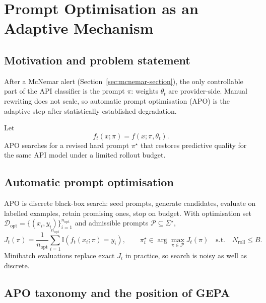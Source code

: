 \chapter{Prompt Optimisation as an Adaptive Mechanism}
\label{chap:prompt-optimisation}

\section{Motivation and problem statement}
\label{sec:motivation-prompt-adaptation}

After a McNemar alert (Section~\ref{sec:mcnemar-section}), the only controllable part of the API classifier is the prompt \(\pi\): weights \(\theta_t\) are provider-side. Manual rewriting does not scale, so automatic prompt optimisation (APO) is the adaptive step after statistically established degradation.

Let
\begin{equation}
    f_t(x;\pi)=f(x;\pi,\theta_t).
\end{equation}
APO searches for a revised hard prompt \(\pi^\star\) that restores predictive quality for the same API model under a limited rollout budget.

\section{Automatic prompt optimisation}
\label{sec:general-formulation-apo}

APO is discrete black-box search: seed prompts, generate candidates, evaluate on labelled examples, retain promising ones, stop on budget. With optimisation set \(\mathcal{D}_{\mathrm{opt}}=\{(x_i,y_i)\}_{i=1}^{n_{\mathrm{opt}}}\) and admissible prompts \(\mathcal{P}\subseteq\Sigma^\star\),
\begin{equation}
    J_t(\pi)
    =
    \frac{1}{n_{\mathrm{opt}}}
    \sum_{i=1}^{n_{\mathrm{opt}}}
    \mathbb{I}\!\left(f_t(x_i;\pi)=y_i\right),
    \qquad
    \pi_t^\star \in \arg\max_{\pi\in\mathcal{P}} J_t(\pi)
    \quad\text{s.t.}\quad
    N_{\mathrm{roll}}\le B.
\end{equation}
Minibatch evaluations replace exact \(J_t\) in practice, so search is noisy as well as discrete.

\section{APO taxonomy and the position of GEPA}
\label{sec:taxonomy-apo}

